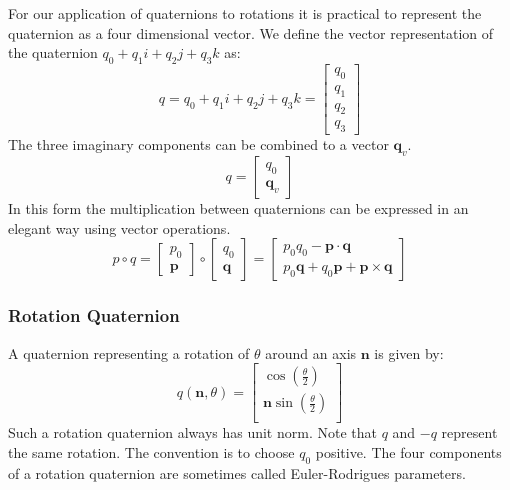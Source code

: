 \documentclass[a4paper]{paper}
\begin{document}
For our application of quaternions to rotations it is practical to represent the quaternion as a four dimensional vector. We define the vector representation of the quaternion $q_0 + q_1 i + q_2 j + q_3 k$ as:
\begin{equation}
    q = q_0 + q_1 i + q_2 j + q_3 k = \left[ \begin{array}{c} q_0 \\ q_1 \\ q_2 \\ q_3  \end{array} \right]
\end{equation}
The three imaginary components can be combined to a vector $\bm{q}_v$.
\begin{equation}
    q = \left[ \begin{array}{c} q_0 \\ \bm{q}_v  \end{array} \right]
\end{equation}
In this form the multiplication between quaternions can be expressed in an elegant way using vector operations.
\begin{equation}
    p \circ q =
    \left[ \begin{array}{c} p_0 \\ \bm{p} \end{array} \right]
    \circ
    \left[ \begin{array}{c} q_0 \\ \bm{q} \end{array} \right]
    = \left[ \begin{array}{c}
            p_0 q_0 - \bm{p} \cdot \bm{q} \\
            p_0 \bm{q} + q_0 \bm{p} + \bm{p} \times \bm{q}
      \end{array} \right]
\label{eq:quat_mult_vect}
\end{equation}

\subsubsection{Rotation Quaternion}

A quaternion representing a rotation of $\theta$ around an axis $\bm{n}$ is given by:
\begin{equation}
    q(\bm n, \theta) =
        \left[\begin{array}{c}
            \cos{(\frac{\theta}{2})}\\
            \bm{n} \sin{(\frac{\theta}{2})}\\
        \end{array}\right]
\label{eq:rotation_quat}
\end{equation}
Such a rotation quaternion always has unit norm.
Note that $q$ and $-q$ represent the same rotation.
The convention is to choose $q_0$ positive.
The four components of a rotation quaternion are sometimes called Euler-Rodrigues parameters.
\end{document}
